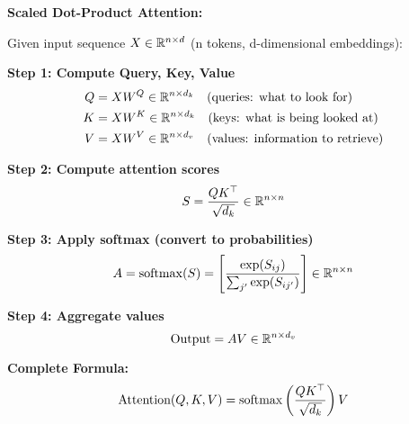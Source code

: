 \begin{seanbox}{3.6}
	\textbf{Scaled Dot-Product Attention:}
	
	Given input sequence $X \in \mathbb{R}^{n \times d}$ (n tokens, d-dimensional embeddings):
	
	\textbf{Step 1: Compute Query, Key, Value}
	\begin{align}
		Q &= X W^Q \in \mathbb{R}^{n \times d_k} \quad \text{(queries: what to look for)} \\
		K &= X W^K \in \mathbb{R}^{n \times d_k} \quad \text{(keys: what is being looked at)} \\
		V &= X W^V \in \mathbb{R}^{n \times d_v} \quad \text{(values: information to retrieve)}
	\end{align}
	
	\textbf{Step 2: Compute attention scores}
	\begin{equation}
		S = \frac{QK^\top}{\sqrt{d_k}} \in \mathbb{R}^{n \times n}
	\end{equation}
	
	\textbf{Step 3: Apply softmax (convert to probabilities)}
	\begin{equation}
		A = \operatorname{softmax}(S) = \left[\frac{\exp(S_{ij})}{\sum_{j'} \exp(S_{ij'})}\right] \in \mathbb{R}^{n \times n}
	\end{equation}
	
	\textbf{Step 4: Aggregate values}
	\begin{equation}
		\text{Output} = AV \in \mathbb{R}^{n \times d_v}
	\end{equation}
	
	\textbf{Complete Formula:}
	\begin{equation}
		\text{Attention}(Q, K, V) = \operatorname{softmax}\left(\frac{QK^\top}{\sqrt{d_k}}\right) V
	\end{equation}
\end{seanbox}

